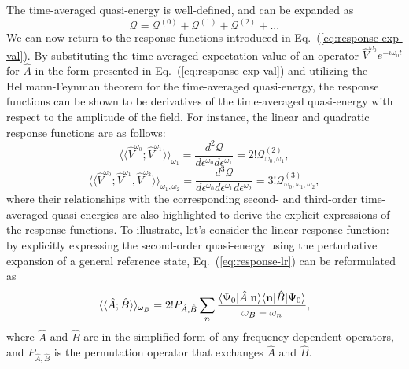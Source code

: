 The time-averaged quasi-energy is well-defined, and can be expanded as
\begin{equation}
\mathcal{Q} = \mathcal{Q}^{(0)} + \mathcal{Q}^{(1)} +  \mathcal{Q}^{(2)} + ...
\end{equation}
We can now return to the response functions introduced in Eq.~(\ref{eq:response-exp-val}). By substituting the time-averaged expectation value of an operator $\hat{V}^{\omega_{0}}e^{-i\omega_{0}t}$ for $\hat{A}$ in the form presented in Eq.~(\ref{eq:response-exp-val}) and utilizing the Hellmann-Feynman theorem for the time-averaged quasi-energy, the response functions can be shown to be derivatives of the time-averaged quasi-energy with respect to the amplitude of the field. For instance, the linear and quadratic response functions are as follows:
\begin{equation}
\langle\langle\hat{V}^{\omega_{0}};\hat{V}^{\omega_{1}}\rangle\rangle_{\omega_{1}} = \frac{d^{2}\mathcal{Q}}{d\epsilon^{\omega_{0}}d\epsilon^{\omega_{1}}} 
= 2! \mathcal{Q}_{\omega_{0}, \omega_{1}}^{(2)},
\label{eq:response-lr}
\end{equation}
\begin{equation}
\langle\langle\hat{V}^{\omega_{0}};\hat{V}^{\omega_{1}}, \hat{V}^{\omega_{2}}\rangle\rangle_{\omega_{1}, \omega_{2}} = \frac{d^{3}\mathcal{Q}}{d\epsilon^{\omega_{0}}d\epsilon^{\omega_{1}}d\epsilon^{\omega_{2}}}
= 3! \mathcal{Q}_{\omega_{0}, \omega_{1}, \omega_{2}}^{(3)},
\end{equation}
where their relationships with the corresponding second- and third-order time-averaged quasi-energies are also highlighted to derive the explicit expressions of the response functions. To illustrate, let's consider the linear response function: by explicitly expressing the second-order quasi-energy using the perturbative expansion of a general reference state, Eq.~(\ref{eq:response-lr}) can be reformulated as
\begin{equation}
\langle\langle \hat{A};\hat{B}\rangle\rangle_{\omega_{B}} = 2!P_{\hat{A},\hat{B}}\sum_{n}\frac{\langle\Psi_{0} |\hat{A}| \textbf{n} \rangle\langle\textbf{n} |\hat{B}| \Psi_{0} \rangle}{\omega_{B}-\omega_{n}},
\end{equation}
where $\hat{A}$ and $\hat{B}$ are in the simplified form of any frequency-dependent operators, and $P_{\hat{A},\hat{B}}$ is the permutation operator that exchanges $\hat{A}$ and $\hat{B}$. 


